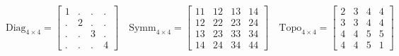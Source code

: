 \begin{equation*}
\scriptstyle
\mbox{Diag}_{4 \times 4} =
\left[
\begin{array}{rrrr}
  1 & . & . & . \\ 
  . & 2 & . & . \\ 
  . & . & 3 & . \\ 
  . & . & . & 4  
\end{array}
\right]
\quad
%
\mbox{Symm}_{4 \times 4} =
\left[
\begin{array}{rrrr}
  11 & 12 & 13 & 14 \\ 
  12 & 22 & 23 & 24 \\ 
  13 & 23 & 33 & 34 \\ 
  14 & 24 & 34 & 44  
\end{array}
\right]
\quad
%
\mbox{Topo}_{4 \times 4} =
\left[
\begin{array}{rrrr}
  2 & 3 & 4 & 4 \\ 
  3 & 3 & 4 & 4 \\ 
  4 & 4 & 5 & 5 \\ 
  4 & 4 & 5 & 1 
\end{array}
\right]
\end{equation*}

